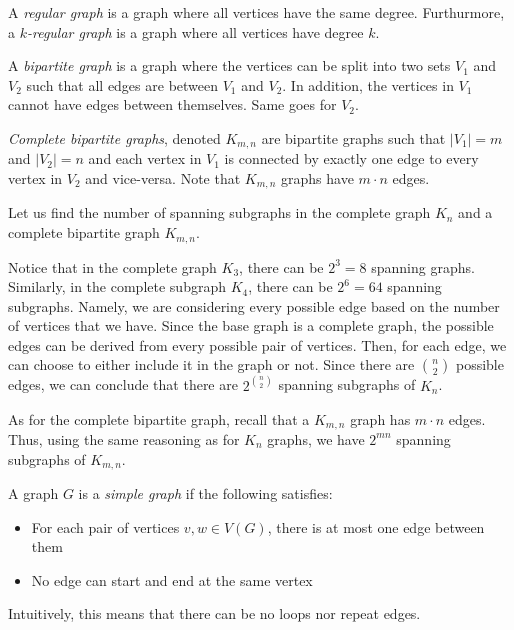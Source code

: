 \begin{definition}
  A \textit{regular graph} is a graph where all vertices have the same degree. 
  Furthurmore, a \textit{\(k\)-regular graph} is a graph where all vertices have degree \(k\).
\end{definition}

\begin{definition}
  A \textit{bipartite graph} is a graph where the vertices can be split into two sets
  \(V_1\) and \(V_2\) such that all edges are between \(V_1\) and \(V_2\). In
  addition, the vertices in \(V_1\) cannot have edges between themselves. Same
  goes for \(V_2\).
\end{definition}

\begin{definition}
  \textit{Complete bipartite graphs}, denoted \(K_{m, n}\) are bipartite graphs such that \(|V_1| = m\) and \(|V_2| = n\) and each vertex in \(V_1\) is
  connected by exactly one edge to every vertex in \(V_2\) and vice-versa. Note
  that \(K_{m, n}\) graphs have \(m \cdot n \) edges.
\end{definition}

\begin{nexample}
  Let us find the number of spanning subgraphs in the complete graph \(K_n\) and a complete bipartite graph \(K_{m, n}\).

  Notice that in the complete graph \(K_3\), there can be \(2^3 = 8\) spanning graphs.
  Similarly, in the complete subgraph \(K_4\), there can be 
  \(2^6 = 64\) spanning subgraphs. Namely, we are considering every possible
  edge based on the number of vertices that we have. Since the base graph is a complete graph, the possible edges can be derived from every possible pair of vertices. Then, for each edge, we can choose to
  either include it in the graph or not. Since there are \(\binom{n}{2}\)
  possible edges, we can conclude that there are \(2^{\binom{n}{2}}\) spanning subgraphs of \(K_n\).

  As for the complete bipartite graph, recall that a \(K_{m, n}\) graph has
  \(m \cdot n\) edges. Thus, using the same reasoning as for \(K_n\) graphs, we have \(2^{mn}\) spanning subgraphs of \(K_{m, n}\).
\end{nexample}

\begin{definition}
  A graph \(G\) is a \textit{simple graph} if the following satisfies:
  \begin{itemize}
    \item For each pair of vertices \(v, w \in V(G)\), there is at most one edge
      between them
    \item No edge can start and end at the same vertex
  \end{itemize}
  Intuitively, this means that there can be no loops nor repeat edges.
\end{definition}

